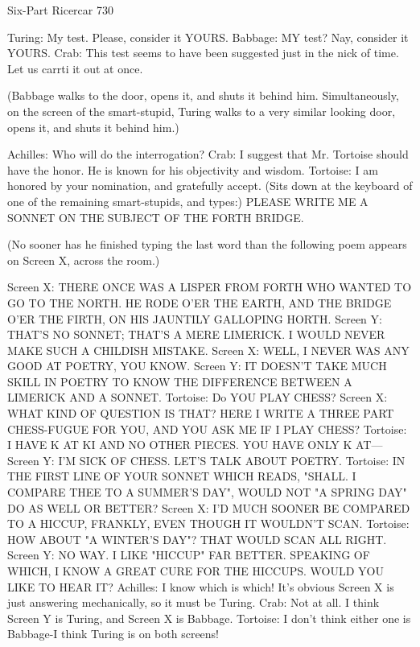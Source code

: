 Six-Part Ricercar                                                                     730

Turing: My test. Please, consider it YOURS.
Babbage: MY test? Nay, consider it YOURS.
Crab: This test seems to have been suggested just in the nick of time. Let us carrti it out at
  once.

   (Babbage walks to the door, opens it, and shuts it behind him. Simultaneously, on the
   screen of the smart-stupid, Turing walks to a very similar looking door, opens it, and
   shuts it behind him.)

Achilles: Who will do the interrogation?
Crab: I suggest that Mr. Tortoise should have the honor. He is known for his objectivity
  and wisdom.
Tortoise: I am honored by your nomination, and gratefully accept. (Sits down at the
  keyboard of one of the remaining smart-stupids, and types:) PLEASE WRITE ME A
  SONNET ON THE SUBJECT OF THE FORTH BRIDGE.

   (No sooner has he finished typing the last word than the following poem appears on
   Screen X, across the room.)

Screen X:      THERE ONCE WAS A LISPER FROM FORTH
               WHO WANTED TO GO TO THE NORTH.
               HE RODE O'ER THE EARTH,
               AND THE BRIDGE O'ER THE FIRTH,
               ON HIS JAUNTILY GALLOPING HORTH.
Screen Y: THAT'S NO SONNET; THAT'S A MERE LIMERICK. I WOULD NEVER
MAKE SUCH A CHILDISH MISTAKE.
Screen X: WELL, I NEVER WAS ANY GOOD AT POETRY, YOU KNOW.
Screen Y: IT DOESN'T TAKE MUCH SKILL IN POETRY TO KNOW THE
   DIFFERENCE BETWEEN A LIMERICK AND A SONNET.
Tortoise: Do YOU PLAY CHESS?
Screen X: WHAT KIND OF QUESTION IS THAT? HERE I WRITE A THREE PART
   CHESS-FUGUE FOR YOU, AND YOU ASK ME IF I PLAY CHESS?
Tortoise: I HAVE K AT KI AND NO OTHER PIECES. YOU HAVE ONLY K AT---
Screen Y: I'M SICK OF CHESS. LET'S TALK ABOUT POETRY.
Tortoise: IN THE FIRST LINE OF YOUR SONNET WHICH READS, "SHALL. I
   COMPARE THEE TO A SUMMER'S DAY", WOULD NOT "A SPRING DAY" DO
   AS WELL OR BETTER?
Screen X: I'D MUCH SOONER BE COMPARED TO A HICCUP, FRANKLY, EVEN
   THOUGH IT WOULDN'T SCAN.
Tortoise: HOW ABOUT "A WINTER'S DAY"? THAT WOULD SCAN ALL RIGHT.
Screen Y: NO WAY. I LIKE "HICCUP" FAR BETTER. SPEAKING OF WHICH, I
   KNOW A GREAT CURE FOR THE HICCUPS. WOULD YOU LIKE TO HEAR IT?
Achilles: I know which is which! It's obvious Screen X is just answering mechanically,
   so it must be Turing.
Crab: Not at all. I think Screen Y is Turing, and Screen X is Babbage.
Tortoise: I don't think either one is Babbage-I think Turing is on both screens!

